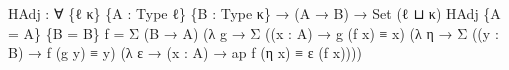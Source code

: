 \documentclass[
  11pt,
  oneside,
  article]{memoir}
\newenvironment{Shaded}{}{}
\newcommand{\DataTypeTok}[1]{\textcolor[rgb]{0.56,0.13,0.00}{#1}}
\newcommand{\NormalTok}[1]{#1}
\newcommand{\OtherTok}[1]{\textcolor[rgb]{0.00,0.44,0.13}{#1}}
\theoremstyle{definition}
\theoremstyle{plain}
\newcommand{\0}{\textsf{0}}
\newcommand{\1}{\tn{\textsf{1}}}
\begin{document}
\begin{Shaded}
\begin{Highlighting}[]
\NormalTok{HAdj }\OtherTok{:} \OtherTok{∀} \OtherTok{\{}\NormalTok{ℓ κ}\OtherTok{\}} \OtherTok{\{}\NormalTok{A }\OtherTok{:}\NormalTok{ Type ℓ}\OtherTok{\}} \OtherTok{\{}\NormalTok{B }\OtherTok{:}\NormalTok{ Type κ}\OtherTok{\}}
       \OtherTok{→} \OtherTok{(}\NormalTok{A }\OtherTok{→}\NormalTok{ B}\OtherTok{)} \OtherTok{→} \DataTypeTok{Set} \OtherTok{(}\NormalTok{ℓ ⊔ κ}\OtherTok{)}
\NormalTok{HAdj }\OtherTok{\{}\NormalTok{A }\OtherTok{=}\NormalTok{ A}\OtherTok{\}} \OtherTok{\{}\NormalTok{B }\OtherTok{=}\NormalTok{ B}\OtherTok{\}}\NormalTok{ f }\OtherTok{=}
\NormalTok{    Σ }\OtherTok{(}\NormalTok{B }\OtherTok{→}\NormalTok{ A}\OtherTok{)} \OtherTok{(λ}\NormalTok{ g }\OtherTok{→} 
\NormalTok{      Σ }\OtherTok{((}\NormalTok{x }\OtherTok{:}\NormalTok{ A}\OtherTok{)} \OtherTok{→}\NormalTok{ g }\OtherTok{(}\NormalTok{f x}\OtherTok{)}\NormalTok{ ≡ x}\OtherTok{)} \OtherTok{(λ}\NormalTok{ η }\OtherTok{→} 
\NormalTok{        Σ }\OtherTok{((}\NormalTok{y }\OtherTok{:}\NormalTok{ B}\OtherTok{)} \OtherTok{→}\NormalTok{ f }\OtherTok{(}\NormalTok{g y}\OtherTok{)}\NormalTok{ ≡ y}\OtherTok{)} \OtherTok{(λ}\NormalTok{ ε }\OtherTok{→} 
          \OtherTok{(}\NormalTok{x }\OtherTok{:}\NormalTok{ A}\OtherTok{)} \OtherTok{→}\NormalTok{ ap f }\OtherTok{(}\NormalTok{η x}\OtherTok{)}\NormalTok{ ≡ ε }\OtherTok{(}\NormalTok{f x}\OtherTok{))))}


\end{Highlighting}
\end{Shaded}
\end{document}
